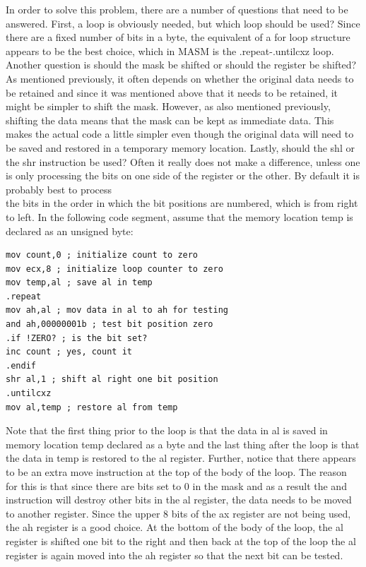 \documentclass[10pt]{book}
\begin{document}
In order to solve this problem, there are a number of questions that need to be answered. First, a loop is obviously needed, but which loop should be used? Since there are a fixed number of bits in a byte, the equivalent of a for loop structure appears to be the best choice, which in MASM is the .repeat-.untilcxz loop. Another question is should the mask be shifted or should the register be shifted? As mentioned previously, it often depends on whether the original data needs to be retained and since it was mentioned above that it needs to be retained, it might be simpler to shift the mask. However, as also mentioned previously, shifting the data means that the mask can be kept as immediate data. This makes the actual code a little simpler even though the original data will need to be saved and restored in a temporary memory location. Lastly, should the shl or the shr instruction be used? Often it really does not make a difference, unless one is only processing the bits on one side of the register or the other. By default it is probably best to process\\
the bits in the order in which the bit positions are numbered, which is from right to left. In the following code segment, assume that the memory location temp is declared as an unsigned byte:

\begin{verbatim}
mov count,0 ; initialize count to zero
mov ecx,8 ; initialize loop counter to zero
mov temp,al ; save al in temp
.repeat
mov ah,al ; mov data in al to ah for testing
and ah,00000001b ; test bit position zero
.if !ZERO? ; is the bit set?
inc count ; yes, count it
.endif
shr al,1 ; shift al right one bit position
.untilcxz
mov al,temp ; restore al from temp
\end{verbatim}

Note that the first thing prior to the loop is that the data in al is saved in memory location temp declared as a byte and the last thing after the loop is that the data in temp is restored to the al register. Further, notice that there appears to be an extra move instruction at the top of the body of the loop. The reason for this is that since there are bits set to 0 in the mask and as a result the and instruction will destroy other bits in the al register, the data needs to be moved to another register. Since the upper 8 bits of the ax register are not being used, the ah register is a good choice. At the bottom of the body of the loop, the al register is shifted one bit to the right and then back at the top of the loop the al register is again moved into the ah register so that the next bit can be tested.
\end{document}
